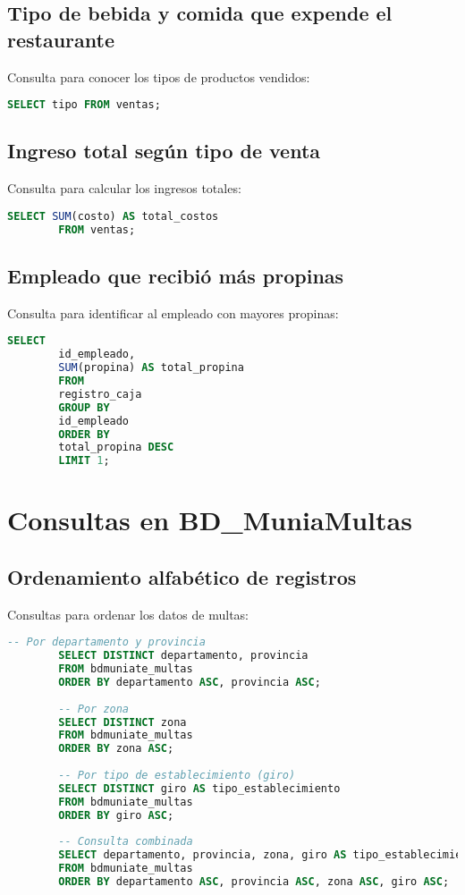 \documentclass[12pt]{article}
\begin{document}
	\subsection{Tipo de bebida y comida que expende el restaurante}
	Consulta para conocer los tipos de productos vendidos:
	\begin{lstlisting}[language=SQL]
		SELECT tipo FROM ventas;
	\end{lstlisting}
	
	\subsection{Ingreso total según tipo de venta}
	Consulta para calcular los ingresos totales:
	\begin{lstlisting}[language=SQL]
		SELECT SUM(costo) AS total_costos
		FROM ventas;
	\end{lstlisting}
	
	\subsection{Empleado que recibió más propinas}
	Consulta para identificar al empleado con mayores propinas:
	\begin{lstlisting}[language=SQL]
		SELECT 
		id_empleado,
		SUM(propina) AS total_propina
		FROM 
		registro_caja
		GROUP BY 
		id_empleado
		ORDER BY 
		total_propina DESC
		LIMIT 1;
	\end{lstlisting}
	
	\section{Consultas en BD\_MuniaMultas}
	
	\subsection{Ordenamiento alfabético de registros}
	Consultas para ordenar los datos de multas:
	
	\begin{lstlisting}[language=SQL]
		-- Por departamento y provincia
		SELECT DISTINCT departamento, provincia
		FROM bdmuniate_multas
		ORDER BY departamento ASC, provincia ASC;
		
		-- Por zona
		SELECT DISTINCT zona
		FROM bdmuniate_multas
		ORDER BY zona ASC;
		
		-- Por tipo de establecimiento (giro)
		SELECT DISTINCT giro AS tipo_establecimiento
		FROM bdmuniate_multas
		ORDER BY giro ASC;
		
		-- Consulta combinada
		SELECT departamento, provincia, zona, giro AS tipo_establecimiento
		FROM bdmuniate_multas
		ORDER BY departamento ASC, provincia ASC, zona ASC, giro ASC;
	\end{lstlisting}
	
\end{document}
